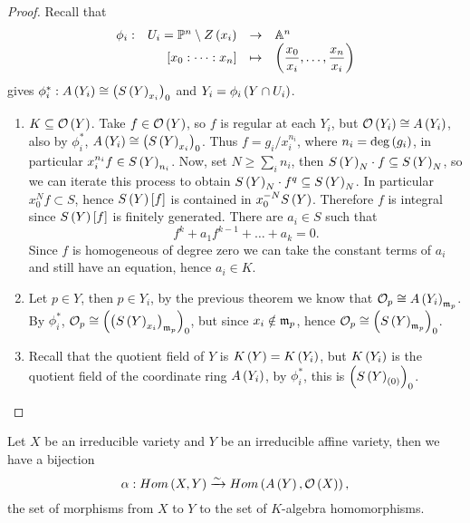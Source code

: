 \pagebreak

\begin{proof}
Recall that
$$ \function[\phi_i]{U_i = \P^n \setminus Z\rb{x_i}}{\A^n}{\sb{x_0 : \dots : x_n}}{\rb{\dfrac{x_0}{x_i}, \dots, \dfrac{x_n}{x_i}}} $$
gives $ \phi_i^* : A\left( Y_i \right) \cong \left( S\left( Y \right)_{x_i} \right)_0 $ and $ Y_i = \phi_i\left( Y \cap U_i \right) $.
\begin{enumerate}
\item $ K \subseteq \mathcal{O}\left( Y \right) $. Take $ f \in \mathcal{O}\left( Y \right) $, so $ f $ is regular at each $ Y_i $, but $ \mathcal{O}\left( Y_i \right) \cong A\left( Y_i \right) $, also by $ \phi_i^* $, $ A\left( Y_i \right) \cong \left( S\left( Y \right)_{x_i} \right)_0 $. Thus $ f = g_i / x_i^{n_i} $, where $ n_i = \deg\left( g_i \right) $, in particular $ x_i^{n_i}f \in S\left( Y \right)_{n_i} $. Now, set $ N \ge \sum_i n_i $, then $ S\left( Y \right)_N \cdot f \subseteq S\left( Y \right)_N $, so we can iterate this process to obtain $ S\left( Y \right)_N \cdot f^q \subseteq S\left( Y \right)_N $. In particular $ x_0^Nf \subset S $, hence $ S\left( Y \right)\left[ f \right] $ is contained in $ x_0^{-N}S\left( Y \right) $. Therefore $ f $ is integral since $ S\left( Y \right)\left[ f \right] $ is finitely generated. There are $ a_i \in S $ such that
$$ f^k + a_1f^{k - 1} + \dots + a_k = 0. $$
Since $ f $ is homogeneous of degree zero we can take the constant terms of $ a_i $ and still have an equation, hence $ a_i \in K $.
\item Let $ p \in Y $, then $ p \in Y_i $, by the previous theorem we know that $ \mathcal{O}_p \cong A\left( Y_i \right)_{\mathfrak{m}_p} $. By $ \phi_i^* $, $ \mathcal{O}_p \cong \left( \left( S\left( Y \right)_{x_i} \right)_{\mathfrak{m}_p} \right)_0 $, but since $ x_i \notin \mathfrak{m}_p $, hence $ \mathcal{O}_p \cong \left( S\left( Y \right)_{\mathfrak{m}_p} \right)_0 $.
\item Recall that the quotient field of $ Y $ is $ K\left( Y \right) = K\left( Y_i \right) $, but $ K\left( Y_i \right) $ is the quotient field of the coordinate ring $ A\left( Y_i \right) $, by $ \phi_i^* $, this is $ \left( S\left( Y \right)_{\left( 0 \right)} \right)_0 $.
\end{enumerate}
\end{proof}


\begin{proposition}
Let $ X $ be an irreducible variety and $ Y $ be an irreducible affine variety, then we have a bijection
$$ \alpha : Hom\left( X, Y \right) \xrightarrow{\sim} Hom\left( A\left( Y \right), \mathcal{O}\left( X \right) \right), $$
the set of morphisms from $ X $ to $ Y $ to the set of $ K $-algebra homomorphisms.
\end{proposition}

